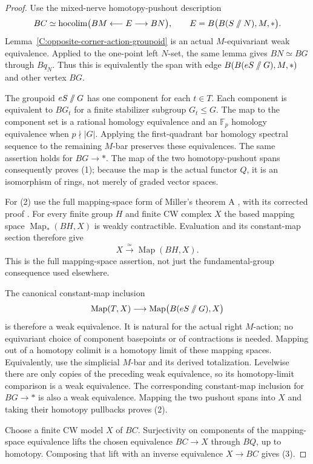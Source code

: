 \begin{proof}
Use the mixed-nerve homotopy-pushout description
\[
 BC\simeq\operatorname{hocolim}
 \bigl(BM\longleftarrow E\longrightarrow BN\bigr),
 \qquad
 E=B\bigl(B(S\mathbin{/\mkern-6mu/}N),M,*\bigr).
\]
Lemma~\ref{C:opposite-corner-action-groupoid} is an actual
$M$-equivariant weak equivalence. Applied to the one-point left
$N$-set, the same lemma gives $BN\simeq BG$ through $Bq_N$.
Thus this is equivalently the span with edge
$B(B(eS\mathbin{/\mkern-6mu/}G),M,*)$ and other vertex $BG$.

The groupoid $eS\mathbin{/\mkern-6mu/}G$ has one component for each
$t\in T$. Each component is equivalent to $BG_t$ for a finite
stabilizer subgroup $G_t\leq G$. The map to the component set is
a rational homology equivalence and an $\mathbb F_p$ homology
equivalence when $p\nmid|G|$. Applying the first-quadrant bar
homology spectral sequence to the remaining $M$-bar preserves
these equivalences. The same assertion holds for $BG\to *$.
The map of the two homotopy-pushout spans consequently proves (1);
because the map is the actual functor $Q$, it is an isomorphism
of rings, not merely of graded vector spaces.

For (2) use the full mapping-space form of Miller's theorem A
\cite[Theorem A, p.~39]{miller1984}, with its corrected proof
\cite{miller1985}. For every finite group $H$ and finite CW
complex $X$ the based mapping space $\operatorname{Map}_*(BH,X)$
is weakly contractible. Evaluation and its constant-map section
therefore give
\[
 X\xrightarrow{\simeq}\operatorname{Map}(BH,X).
\]
This is the full mapping-space assertion, not just the
fundamental-group consequence used elsewhere.

The canonical constant-map inclusion
\[
 \operatorname{Map}(T,X)\longrightarrow
 \operatorname{Map}\bigl(B(eS\mathbin{/\mkern-6mu/}G),X\bigr)
\]
is therefore a weak equivalence. It is natural for the actual
right $M$-action; no equivariant choice of component basepoints or
of contractions is needed. Mapping out of a homotopy colimit is
a homotopy limit of these mapping spaces. Equivalently, use the
simplicial $M$-bar and its derived totalization. Levelwise there
are only copies of the preceding weak equivalence, so its
homotopy-limit comparison is a weak equivalence. The corresponding
constant-map inclusion for $BG\to *$ is also a weak equivalence.
Mapping the two pushout spans into $X$ and taking their homotopy
pullbacks proves (2).

Choose a finite CW model $X$ of $BC$. Surjectivity on components
of the mapping-space equivalence lifts the chosen equivalence
$BC\to X$ through $BQ$, up to homotopy. Composing that lift with
an inverse equivalence $X\to BC$ gives (3).
\end{proof}


